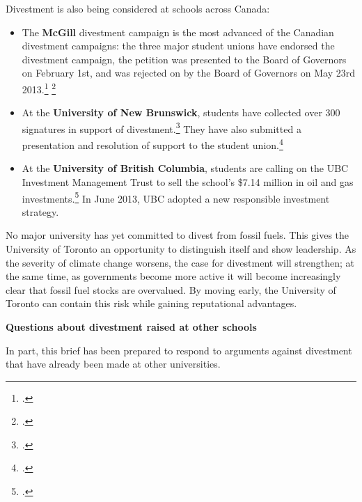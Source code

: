 Divestment is also being considered at schools across Canada:
\begin{itemize}
	\item The \textbf{McGill} divestment campaign is the most advanced of the Canadian divestment campaigns: the three major student unions have endorsed the divestment campaign, the petition was presented to the Board of Governors on February 1st, and was rejected on by the Board of Governors on May 23rd 2013.\footcite[][]{McGillStudentExecs} \footcite[][]{McGillDelivers}
	\item At the \textbf{University of New Brunswick}, students have collected over 300 signatures in support of divestment.\footcite[][]{UNBPetition} They have also submitted a presentation and resolution of support to the student union.\footcite[][]{UNBStudentUnion}
	\item At the \textbf{University of British Columbia}, students are calling on the UBC Investment Management Trust to sell the school's \$7.14 million in oil and gas investments.\footcite[][]{UBCDivest} In June 2013, UBC adopted a new responsible investment strategy.
\end{itemize}



No major university has yet committed to divest from fossil fuels.
This gives the University of Toronto an opportunity to distinguish itself and show leadership.
As the severity of climate change worsens, the case for divestment will strengthen; at the same time, as governments become more active it will become increasingly clear that fossil fuel stocks are overvalued.
By moving early, the University of Toronto can contain this risk while gaining reputational advantages.



\textbf{Questions about divestment raised at other schools}



In part, this brief has been prepared to respond to arguments against divestment that have already been made at other universities.



